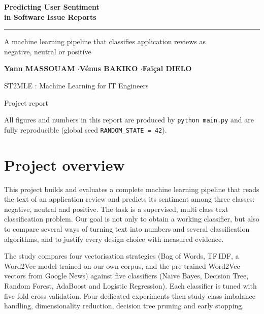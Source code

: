 \documentclass[11pt,a4paper]{article}
\newcommand{\sectionrule}{\textcolor{accent}{\rule{\linewidth}{1.2pt}}}
\begin{document}
\begin{titlepage}
\centering
\vspace*{2.2cm}
{\color{primary}\Huge\bfseries Predicting User Sentiment\\[0.3cm] in Software Issue Reports\par}
\vspace{0.6cm}
\sectionrule\par
\vspace{0.6cm}
{\Large A machine learning pipeline that classifies application reviews as\\
negative, neutral or positive\par}
\vspace{2.2cm}
{\large\bfseries Yann MASSOUAM \quad$\cdot$\quad Vénus BAKIKO \quad$\cdot$\quad Faïçal DIELO\par}
\vspace{0.8cm}
{\large ST2MLE : Machine Learning for IT Engineers\par}
\vspace{0.4cm}
{\large Project report\par}
\vfill
{\small All figures and numbers in this report are produced by \texttt{python main.py}
and are fully reproducible (global seed \texttt{RANDOM\_STATE = 42}).\par}
\end{titlepage}

\section{Project overview}
This project builds and evaluates a complete machine learning pipeline that reads
the text of an application review and predicts its sentiment among three classes:
negative, neutral and positive. The task is a supervised, multi class text
classification problem. Our goal is not only to obtain a working classifier, but
also to compare several ways of turning text into numbers and several classification
algorithms, and to justify every design choice with measured evidence.

The study compares four vectorisation strategies (Bag of Words, TF\,IDF, a Word2Vec
model trained on our own corpus, and the pre trained Word2Vec vectors from Google
News) against five classifiers (Naive Bayes, Decision Tree, Random Forest, AdaBoost
and Logistic Regression). Each classifier is tuned with five fold cross validation.
Four dedicated experiments then study class imbalance handling, dimensionality
reduction, decision tree pruning and early stopping.
\end{document}
